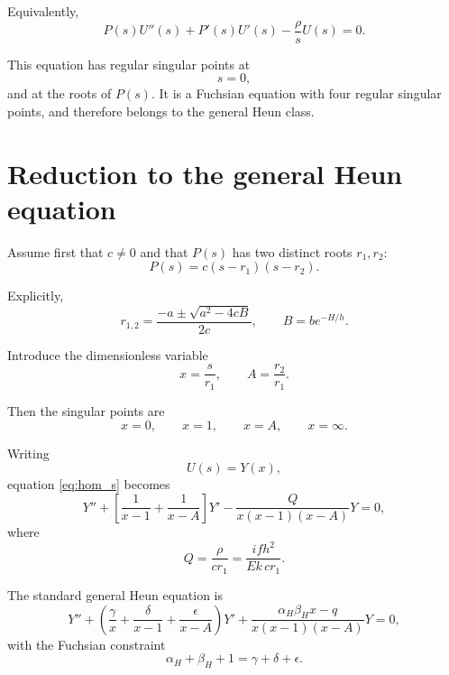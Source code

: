 \documentclass[10pt]{amsart}
\begin{document}
Equivalently,
\begin{equation}
P(s)U''(s)+P'(s)U'(s)-\frac{\rho}{s}U(s)=0.
\label{eq:hom_s}
\end{equation}

This equation has regular singular points at
\[
s=0,
\]
and at the roots of \(P(s)\). It is a Fuchsian equation with four regular singular points, and therefore belongs to the general Heun class.

\section{Reduction to the general Heun equation}

Assume first that \(c\ne 0\) and that \(P(s)\) has two distinct roots \(r_1,r_2\):
\begin{equation}
P(s)=c(s-r_1)(s-r_2).
\label{eq:P_roots}
\end{equation}

Explicitly,
\begin{equation}
r_{1,2}
=
\frac{-a\pm\sqrt{a^2-4cB}}{2c},
\qquad
B=b e^{-H/h}.
\end{equation}

Introduce the dimensionless variable
\begin{equation}
x=\frac{s}{r_1},
\qquad
A=\frac{r_2}{r_1}.
\label{eq:x_A_def}
\end{equation}

Then the singular points are
\[
x=0,\qquad x=1,\qquad x=A,\qquad x=\infty.
\]

Writing
\[
U(s)=Y(x),
\]
equation \eqref{eq:hom_s} becomes
\begin{equation}
Y''+
\left[
\frac{1}{x-1}
+
\frac{1}{x-A}
\right]Y'
-
\frac{Q}{x(x-1)(x-A)}Y
=0,
\label{eq:heun_form}
\end{equation}
where
\begin{equation}
Q
=
\frac{\rho}{c r_1}
=
\frac{i f h^2}{E k\,c r_1}.
\label{eq:Q_def}
\end{equation}

The standard general Heun equation is
\begin{equation}
Y''
+
\left(
\frac{\gamma}{x}
+
\frac{\delta}{x-1}
+
\frac{\epsilon}{x-A}
\right)Y'
+
\frac{\alpha_H\beta_H x-q}
{x(x-1)(x-A)}Y
=0,
\label{eq:standard_heun}
\end{equation}
with the Fuchsian constraint
\begin{equation}
\alpha_H+\beta_H+1=\gamma+\delta+\epsilon.
\end{equation}
\end{document}
